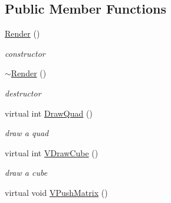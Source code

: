 \subsection*{Public Member Functions}
\begin{DoxyCompactItemize}
\item 
\hypertarget{classPlatform_1_1Render_afcadc91018de7118f2b4d1a90198b145}{
\hyperlink{classPlatform_1_1Render_afcadc91018de7118f2b4d1a90198b145}{Render} ()}
\label{classPlatform_1_1Render_afcadc91018de7118f2b4d1a90198b145}

\begin{DoxyCompactList}\small\item\em constructor \item\end{DoxyCompactList}\item 
\hypertarget{classPlatform_1_1Render_a3cec567f6bcdd5949b7592769cb212e6}{
\hyperlink{classPlatform_1_1Render_a3cec567f6bcdd5949b7592769cb212e6}{$\sim$Render} ()}
\label{classPlatform_1_1Render_a3cec567f6bcdd5949b7592769cb212e6}

\begin{DoxyCompactList}\small\item\em destructor \item\end{DoxyCompactList}\item 
\hypertarget{classPlatform_1_1Render_a8e2963c87022020a364c9af6133ee957}{
virtual int \hyperlink{classPlatform_1_1Render_a8e2963c87022020a364c9af6133ee957}{DrawQuad} ()}
\label{classPlatform_1_1Render_a8e2963c87022020a364c9af6133ee957}

\begin{DoxyCompactList}\small\item\em draw a quad \item\end{DoxyCompactList}\item 
\hypertarget{classPlatform_1_1Render_ae190a0200a0ef2ae1c5d0643bfd3a1e5}{
virtual int \hyperlink{classPlatform_1_1Render_ae190a0200a0ef2ae1c5d0643bfd3a1e5}{VDrawCube} ()}
\label{classPlatform_1_1Render_ae190a0200a0ef2ae1c5d0643bfd3a1e5}

\begin{DoxyCompactList}\small\item\em draw a cube \item\end{DoxyCompactList}\item 
\hypertarget{classPlatform_1_1Render_abe7410af19b104a672a962a14461b289}{
virtual void \hyperlink{classPlatform_1_1Render_abe7410af19b104a672a962a14461b289}{VPushMatrix} ()}
\label{classPlatform_1_1Render_abe7410af19b104a672a962a14461b289}


\end{DoxyCompactItemize}
